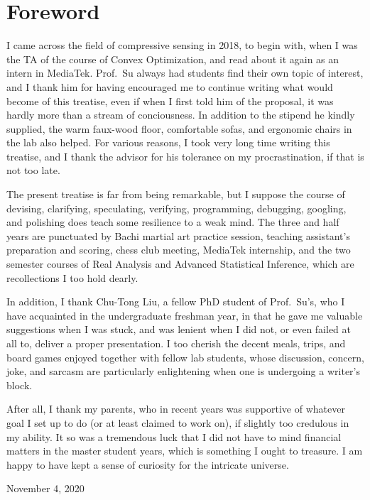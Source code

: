 \chapter* {Foreword}

I came across the field of compressive sensing in 2018, to begin with, when I was the TA of the course of Convex Optimization, and read about it again as an intern in MediaTek.
Prof.\ Su always had students find their own topic of interest, and I thank him for having encouraged me to continue writing what would become of this treatise, even if when I first told him of the proposal, it was hardly more than a stream of conciousness.
In addition to the stipend he kindly supplied, the warm faux-wood floor, comfortable sofas, and ergonomic chairs in the lab also helped.
For various reasons, I took very long time writing this treatise, and I thank the advisor for his tolerance on my procrastination, if that is not too late.

The present treatise is far from being remarkable, but I suppose the course of devising, clarifying, speculating, verifying, programming, debugging, googling, and polishing does teach some resilience to a weak mind.
The three and half years are punctuated by Bachi martial art practice session, teaching assistant's preparation and scoring, chess club meeting, MediaTek internship, and the two semester courses of Real Analysis and Advanced Statistical Inference, which are recollections I too hold dearly.

In addition, I thank Chu-Tong Liu, a fellow PhD student of Prof.\ Su's, who I have acquainted in the undergraduate freshman year, in that he gave me valuable suggestions when I was stuck, and was lenient when I did not, or even failed at all to, deliver a proper presentation.
I too cherish the decent meals, trips, and board games enjoyed together with fellow lab students, whose discussion, concern, joke, and sarcasm are particularly enlightening when one is undergoing a writer's block.

After all, I thank my parents, who in recent years was supportive of whatever goal I set up to do (or at least claimed to work on), if slightly too credulous in my ability.
It so was a tremendous luck that I did not have to mind financial matters in the master student years, which is something I ought to treasure.
I am happy to have kept a sense of curiosity for the intricate universe.

November 4, 2020



